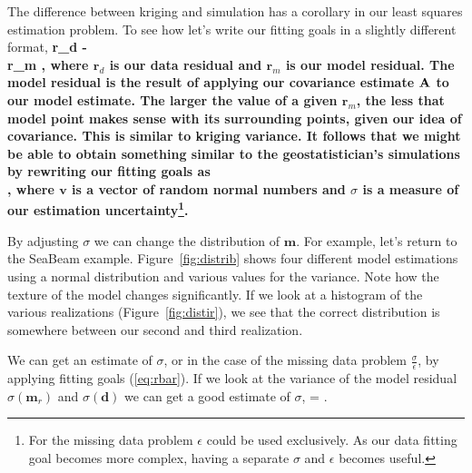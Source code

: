 %
%
%
%
%
%
%
%
The difference between kriging and simulation has a corollary in our
least squares estimation problem. To see how let's write
our fitting goals in a slightly different format,
\beqa
\bf r_d \pox {}  -     \nonumber \\ 
\bf r_m \pox \epsilon \reg {}\label{eq:rbar},
\eeqa
where $\mathbf{r}_d$ is our data residual and $\mathbf{r}_m$ is our model
residual.  The model residual is the result of applying our
covariance estimate $\bf A$ to our model estimate.  The larger
the value of a given $\mathbf{r}_m$, the less that model point makes
sense with its surrounding points, given our idea of covariance.
This is similar to kriging variance.
It follows that we might be able to obtain something similar
to the geostatistician's simulations by rewriting our fitting
goals as 
\beqa
{} \pox  {}    \nonumber \\ 
\sigma {} \pox \epsilon \reg {}\label{eq:rand},
\eeqa
where $\mathbf{v}$ is a vector of random normal numbers and $\sigma$ is 
a measure of our estimation uncertainty\footnote{For the missing
data problem $\epsilon$ could be used exclusively.
As  our data fitting goal becomes more complex,
having a separate  $\sigma$ and $\epsilon$ becomes useful.}.

By adjusting $\sigma$
we can change the distribution of
$\mathbf{m}$. For example, let's return to the SeaBeam example.
Figure~\ref{fig:distrib} shows four different model estimations
using a normal distribution and various values for the variance.
Note how the texture of the model changes significantly. If we look
at a histogram of the various realizations (Figure~\ref{fig:distir}),
we see that the correct
distribution is somewhere between our second and third realization.
\par 
We can get an estimate of $\sigma$, or in the case of the missing
data problem $\frac{\sigma}{\epsilon}$, by applying fitting goals 
(\ref{eq:rbar}). If we look at the variance of the model residual $\sigma(\mathbf{m}_r)$  and 
$\sigma(\mathbf{d})$ we can get a good estimate of $\sigma$,
\beq
\sigma =  \label{eq:sigma.calc} .
\eeq

%

